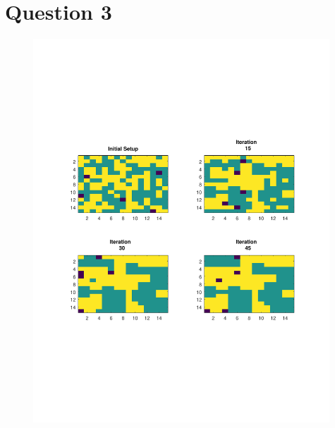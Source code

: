 \documentclass{article}
\begin{document}
\subsection{}


\subsection{}


\subsection{}


\newpage
\section{Question 3}

\begin{figure}[h!]
\centering
    \includegraphics[width=0.99\textwidth]{figure_schelling}
\end{figure}

\end{document}

